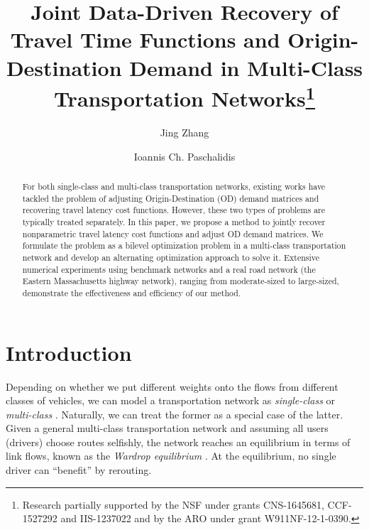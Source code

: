 \documentclass[3p]{elsarticle}
\begin{document}
	
\begin{frontmatter}
	
  \title{Joint Data-Driven Recovery of Travel Time Functions and
    Origin-Destination Demand in Multi-Class Transportation
    Networks\footnote{Research partially supported by the NSF under
      grants CNS-1645681, CCF-1527292 and IIS-1237022 and by the ARO
      under grant W911NF-12-1-0390.}}
	

	\author[mymainaddress]{Jing Zhang}
	
	\author[mysecondaryaddress]{Ioannis Ch. Paschalidis}
	
	\address[mymainaddress]{Division of Systems Eng., Boston University, Brookline, MA 02446.}
	\address[mysecondaryaddress]{Dept. of Electrical and Computer Eng., Boston University, 8 St. Mary's St., Boston, MA 02215.}


\begin{abstract}
  For both single-class and multi-class transportation networks,
  existing works have tackled the problem of adjusting
  Origin-Destination (OD) demand matrices and recovering travel latency
  cost functions. However, these two types of problems are typically
  treated separately. In this paper, we propose a method to jointly
  recover nonparametric travel latency cost functions and adjust OD
  demand matrices. We formulate the problem as a bilevel optimization
  problem in a multi-class transportation network and develop an
  alternating optimization approach to solve it.  Extensive numerical
  experiments using benchmark networks and a real road network (the
  Eastern Massachusetts highway network), ranging from moderate-sized to
  large-sized, demonstrate the effectiveness and efficiency of our
  method.
\end{abstract}
	
	
\begin{keyword}
  
\end{keyword}
	
\end{frontmatter}

\section{Introduction} \label{sec:intro}
	
Depending on whether we put different weights onto the flows from
different classes of vehicles, we can model a transportation network as
\emph{single-class} \cite{dafermos1969traffic} or \emph{multi-class}
\cite{dafermos1972traffic}. Naturally, we can treat the former as a
special case of the latter. Given a general multi-class transportation
network and assuming all users (drivers) choose routes selfishly, the
network reaches an equilibrium in terms of link flows, known as the {\em
  Wardrop equilibrium} \cite{wardrop1952some}. At the equilibrium,
no single driver can ``benefit'' by rerouting.
\end{document}

